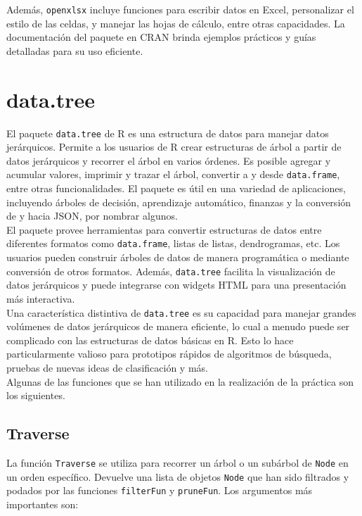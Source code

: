 \documentclass[12pt]{report}\usepackage[]{graphicx}\usepackage[dvipsnames]{xcolor}
\begin{document}
 	Además, \texttt{openxlsx} incluye funciones para escribir datos en Excel, personalizar el estilo de las celdas, y manejar las hojas de cálculo, entre otras capacidades. La documentación del paquete en CRAN brinda ejemplos prácticos y guías detalladas para su uso eficiente.
 	
 	\section{data.tree}
 	
 	El paquete \texttt{data.tree} de R es una estructura de datos para manejar datos jerárquicos. Permite a los usuarios de R crear estructuras de árbol a partir de datos jerárquicos y recorrer el árbol en varios órdenes. Es posible agregar y acumular valores, imprimir y trazar el árbol, convertir a y desde \texttt{data.frame}, entre otras funcionalidades. El paquete es útil en una variedad de aplicaciones, incluyendo árboles de decisión, aprendizaje automático, finanzas y la conversión de y hacia JSON, por nombrar algunos.\\
 	
 	El paquete provee herramientas para convertir estructuras de datos entre diferentes formatos como \texttt{data.frame}, listas de listas, dendrogramas, etc. Los usuarios pueden construir árboles de datos de manera programática o mediante conversión de otros formatos. Además, \texttt{data.tree} facilita la visualización de datos jerárquicos y puede integrarse con widgets HTML para una presentación más interactiva.\\
 	
 	Una característica distintiva de \texttt{data.tree} es su capacidad para manejar grandes volúmenes de datos jerárquicos de manera eficiente, lo cual a menudo puede ser complicado con las estructuras de datos básicas en R. Esto lo hace particularmente valioso para prototipos rápidos de algoritmos de búsqueda, pruebas de nuevas ideas de clasificación y más.\\
 	
 	Algunas de las funciones que se han utilizado en la realización de la práctica son los siguientes.
 	
 	\subsection{Traverse}
 	
 	La función \texttt{Traverse} se utiliza para recorrer un árbol o un subárbol de \texttt{Node} en un orden específico. Devuelve una lista de objetos \texttt{Node} que han sido filtrados y podados por las funciones \texttt{filterFun} y \texttt{pruneFun}. Los argumentos más importantes son:
 	
\end{document}
